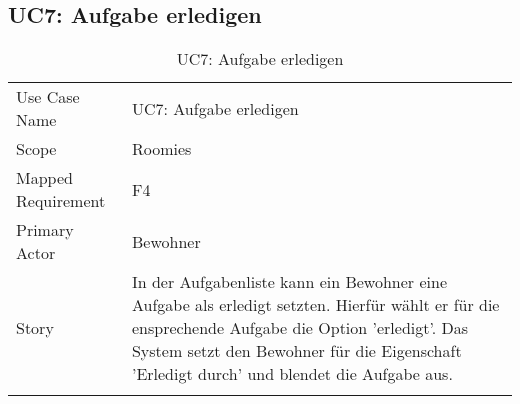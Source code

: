 \subsection{UC7: Aufgabe erledigen}
\begin{table}[H]
	\tablestyle
	\tablealtcolored
	\begin{tabularx}{\textwidth}{lX}
		\tablebody
			Use Case Name &
			UC7: Aufgabe erledigen
			\tabularnewline
			Scope &
			Roomies
			\tabularnewline
			Mapped Requirement &
			F4
			\tabularnewline
			Primary Actor &
			Bewohner
			\tabularnewline
			Story &
			In der Aufgabenliste kann ein Bewohner eine Aufgabe als erledigt setzten. Hierfür wählt er für die ensprechende Aufgabe die Option 'erledigt'. Das System setzt den Bewohner für die Eigenschaft 'Erledigt durch' und blendet die Aufgabe aus.
			\tabularnewline
		\tableend
	\end{tabularx}
	\caption{UC7: Aufgabe erledigen}
\end{table}


